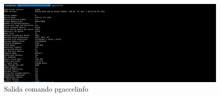 \begin{figure}[H]
    \centering
    \includegraphics[width=\textwidth]{img/pgaccelinfo.jpeg}
    \caption{Salida comando pgaccelinfo}
    \label{fig:GPU}
\end{figure}

